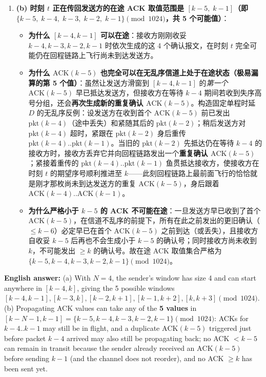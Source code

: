 \begin{enumerate}
\item \textbf{(b) 时刻 $t$ 正在传回发送方的在途 ACK 取值范围是 $[k-5,\; k-1]$（即 $\{k-5,\; k-4,\; k-3,\; k-2,\; k-1\} \pmod{1024}$，共 5 个可能值）}：
  \begin{itemize}
  \item \textbf{为什么 $[k-4, k-1]$ 可以在途}：接收方刚刚收妥 $k-4, k-3, k-2, k-1$ 时依次生成的这 4 个确认报文，在时刻 $t$ 完全可能仍在回程链路上飞行尚未到达发送方。
  \item \textbf{为什么 $\mathrm{ACK}(k-5)$ 也完全可以在无乱序信道上处于在途状态（极易漏算的第 5 个值）}：虽然让发送方滑窗到 $[k-4, k-1]$ 的\emph{第一个} $\mathrm{ACK}(k-5)$ 早已抵达发送方，但接收方在等待 $k-4$ 期间若收到失序高号分组，还会\textbf{再次生成新的重复确认 $\mathrm{ACK}(k-5)$}。构造固定单程时延 $D$ 的无乱序反例：设发送方在收到首个 $\mathrm{ACK}(k-5)$ 前已发出 $\mathrm{pkt}(k-4)$（途中丢失）和紧随其后的 $\mathrm{pkt}(k-2)$；稍后发送方对 $\mathrm{pkt}(k-4)$ 超时，紧跟在 $\mathrm{pkt}(k-2)$ 身后重传 $\mathrm{pkt}(k-4)..\mathrm{pkt}(k-1)$。当旧的 $\mathrm{pkt}(k-2)$ 先抵达仍在等待 $k-4$ 的接收方时，接收方丢弃它并向回程链路发出一个\textbf{重复确认 $\mathrm{ACK}(k-5)$}；紧接着重传的 $\mathrm{pkt}(k-4)..\mathrm{pkt}(k-1)$ 鱼贯抵达接收方，使接收方在时刻 $t$ 的期望序号顺利推进至 $k$——此刻回程链路上最前面飞行的恰恰就是刚才那枚尚未到达发送方的重复 $\mathrm{ACK}(k-5)$，身后跟着 $\mathrm{ACK}(k-4)..\mathrm{ACK}(k-1)$。
  \item \textbf{为什么严格小于 $k-5$ 的 ACK 不可能在途}：一旦发送方早已收到了首个 $\mathrm{ACK}(k-5)$，在信道不乱序的前提下，所有在此之前发出的更旧确认（$\le k-6$）必定早已在首个 $\mathrm{ACK}(k-5)$ 之前到达（或丢失），且接收方自收妥 $k-5$ 后再也不会生成小于 $k-5$ 的确认号；同时接收方尚未收到 $k$，不可能发出 $\ge k$ 的确认号。故在途 ACK 取值集合严格为 $\{k-5, k-4, k-3, k-2, k-1\} \pmod{1024}$。
  \end{itemize}
\end{enumerate}

\textbf{English answer:} (a) With $N=4$, the sender's window has size 4 and can start anywhere in $[k-4, k]$, giving the 5 possible windows $[k-4,k-1], [k-3,k], [k-2,k+1], [k-1,k+2], [k,k+3] \pmod{1024}$. (b) Propagating ACK values can take any of the \textbf{5 values} in $[k-N-1, k-1] = \{k-5, k-4, k-3, k-2, k-1\} \pmod{1024}$: ACKs for $k-4..k-1$ may still be in flight, and a duplicate $\mathrm{ACK}(k-5)$ triggered just before packet $k-4$ arrived may also still be propagating back; no ACK $< k-5$ can remain in transit because the sender already received an $\mathrm{ACK}(k-5)$ before sending $k-1$ (and the channel does not reorder), and no ACK $\ge k$ has been sent yet.


